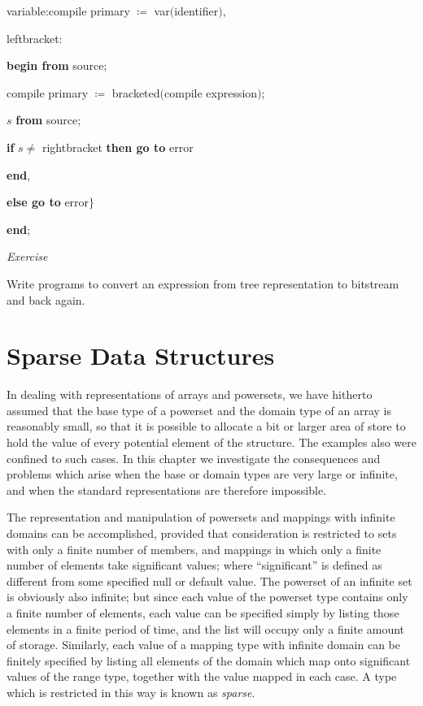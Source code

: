 \noindent
\quad \quad \quad variable:compile primary $\coloneq$ var$($identifier$)$,

\noindent
\quad \quad \quad leftbracket:

\noindent
\quad \quad \quad \textbf{begin from} source;

\noindent
\quad \quad \quad \quad compile primary $\coloneq$ bracketed$($compile expression$)$;

\noindent
\quad \quad \quad \quad $s$ \textbf{from} source;

\noindent
\quad \quad \quad \quad \textbf{if} $s \neq$ rightbracket \textbf{then go to} error

\noindent
\quad \quad \quad \textbf{end},

\noindent
\quad \quad \textbf{else go to} error$\}$

\noindent
\quad \textbf{end};

\noindent
\textit{Exercise}
\nopagebreak

\noindent
Write programs to convert an expression from tree representation to bitstream and back again.

\section[Sparse data structures]{Sparse Data Structures}
\label{sec:sparse-data-structures}

In dealing with representations of arrays and powersets, we have hitherto assumed that the base type of a powerset and the domain type of an array is reasonably small, so that it is possible to allocate a bit or larger area of store to hold the value of every potential element of the structure. The examples also were confined to such cases. In this chapter we investigate the consequences and problems which arise when the base or domain types are very large or infinite, and when the standard representations are therefore impossible.

The representation and manipulation of powersets and mappings with infinite domains can be accomplished, provided that consideration is restricted to sets with only a finite number of members, and mappings in which only a finite number of elements take significant values; where ``significant'' is defined as different from some specified null or default value. The powerset of an infinite set is obviously also infinite; but since each value of the powerset type contains only a finite number of elements, each value can be specified simply by listing those elements in a finite period of time, and the list will occupy only a finite amount of storage. Similarly, each value of a mapping type with infinite domain can be finitely specified by listing all elements of the domain which map onto significant values of the range type, together with the value mapped in each case. A type which is restricted in this way is known as \textit{sparse}.

